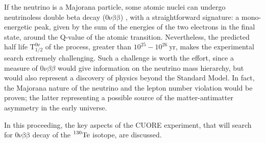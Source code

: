 \documentclass[12pt]{article}
\begin{document}
If the neutrino is a Majorana particle, some atomic nuclei can undergo neutrinoless double beta decay ($\mathrm{0 \nu \beta \beta}$) \cite{0dbd}, with a straightforward signature: a mono-energetic peak, given by the sum of the energies of the two electrons in the final state, around the Q-value of the atomic transition. Nevertheless, the predicted half life $\mathrm{T^{0\nu}_{1/2}}$ of the process, greater than $\mathrm{10^{25} - 10^{26}~yr}$, makes the experimental search extremely challenging. Such a challenge is worth the effort, since a measure of $0 \nu \beta \beta$  would give information on the neutrino mass hierarchy, but would also represent a discovery of physics beyond the Standard Model. In fact, the Majorana nature of the neutrino and the lepton number violation would be proven; the latter representing a possible source of the matter-antimatter asymmetry in the early universe. 

In this proceeding, the key aspects of the CUORE experiment, that will search for $\mathrm{0 \nu \beta \beta}$ decay of the $\mathrm{\prescript{130}{}{\mathrm{Te}}}$ isotope, are discussed. 
\end{document}
